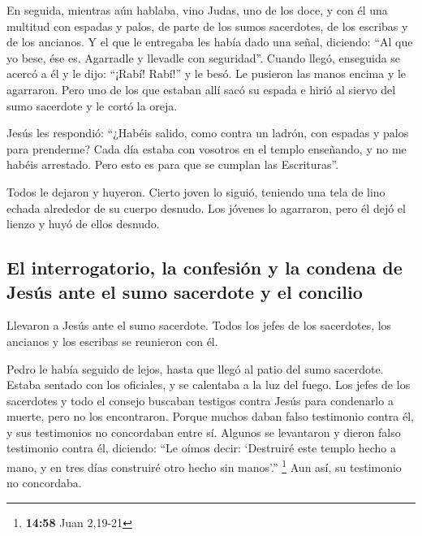 \begin{paracol}{2}
 En seguida, mientras aún hablaba, vino Judas, uno de los
doce, y con él una multitud con espadas y palos, de parte de los sumos
sacerdotes, de los escribas y de los ancianos.  Y el que
le entregaba les había dado una señal, diciendo: ``Al que yo bese, ése
es. Agarradle y llevadle con seguridad''.  Cuando llegó,
enseguida se acercó a él y le dijo: ``¡Rabí! Rabí!'' y le besó.
 Le pusieron las manos encima y le agarraron.
 Pero uno de los que estaban allí sacó su espada e hirió
al siervo del sumo sacerdote y le cortó la oreja.

 Jesús les respondió: ``¿Habéis salido, como contra un
ladrón, con espadas y palos para prenderme?  Cada día
estaba con vosotros en el templo enseñando, y no me habéis arrestado.
Pero esto es para que se cumplan las Escrituras''.

 Todos le dejaron y huyeron.  Cierto joven
lo siguió, teniendo una tela de lino echada alrededor de su cuerpo
desnudo. Los jóvenes lo agarraron,  pero él dejó el
lienzo y huyó de ellos desnudo.

\hypertarget{el-interrogatorio-la-confesiuxf3n-y-la-condena-de-jesuxfas-ante-el-sumo-sacerdote-y-el-concilio}{%
\subsection{El interrogatorio, la confesión y la condena de Jesús ante
el sumo sacerdote y el
concilio}\label{el-interrogatorio-la-confesiuxf3n-y-la-condena-de-jesuxfas-ante-el-sumo-sacerdote-y-el-concilio}}

 Llevaron a Jesús ante el sumo sacerdote. Todos los jefes
de los sacerdotes, los ancianos y los escribas se reunieron con él.

 Pedro le había seguido de lejos, hasta que llegó al
patio del sumo sacerdote. Estaba sentado con los oficiales, y se
calentaba a la luz del fuego.  Los jefes de los
sacerdotes y todo el consejo buscaban testigos contra Jesús para
condenarlo a muerte, pero no los encontraron.  Porque
muchos daban falso testimonio contra él, y sus testimonios no
concordaban entre sí.  Algunos se levantaron y dieron
falso testimonio contra él, diciendo:  ``Le oímos decir:
`Destruiré este templo hecho a mano, y en tres días construiré otro
hecho sin manos'.'' \footnote{\textbf{14:58} Juan 2,19-21}
 Aun así, su testimonio no concordaba.


\end{paracol}
